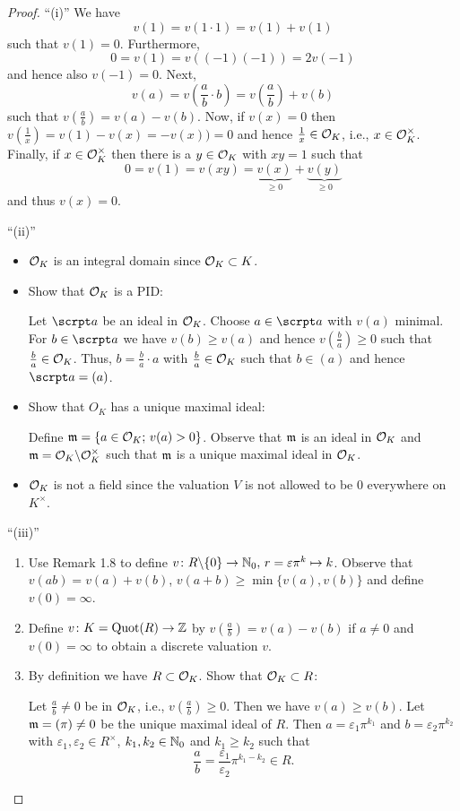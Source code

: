 \begin{proof}
\enquote{(i)}
We have 
\[ v(1) = v(1 \cdot 1) = v(1) + v(1)
\]
such that $v(1) = 0$. Furthermore,
\[ 0 = v(1) = v((-1)(-1)) = 2 v(-1)
\]
and hence also $v(-1)=0$. Next,
\[ v(a) = v\left(\frac{a}{b} \cdot b  \right) = v\left(\frac{a}{b} \right) +v(b)
\]
such that $ v\left(\frac{a}{b} \right) = v(a) -v(b)$.
Now, if $v(x) = 0$ then $v\left(\frac{1}{x} \right) =v(1) -v(x) = -v(x) ) =0$ and hence $\frac{1}{x} \in \mathcal{O}_K$, i.e., $x \in \mathcal{O}_K^\times$.
Finally, if $x \in \mathcal{O}_K^\times$ then there is a $y \in \mathcal{O}_K$ with $xy = 1$ such that
\[ 0 = v(1) = v(xy) = \underbrace{v(x)}_{\geq 0} + \underbrace{v(y)}_{\geq 0}
\]
and thus $v(x) = 0$.

\bigskip \enquote{(ii)} 
\begin{itemize}
\item $\mathcal{O}_K$ is an integral domain since $\mathcal{O}_K\subset K$.

\item Show that $\mathcal{O}_K$ is a PID:

Let $\a$ be an ideal in $\mathcal{O}_K$. Choose $a \in \a$ with $v(a)$ minimal. For $b \in \a$ we have $v(b) \geq v(a)$ and hence $v\left(\frac{b}{a} \right) \geq 0$ such that $\frac{b}{a} \in \mathcal{O}_K$.
Thus, $b = \frac{b}{a} \cdot a$ with $\frac{b}{a} \in \mathcal{O}_K$ such that $b \in (a)$ and hence $\a = (a)$.

\item Show that $O_K$ has a unique maximal ideal:

Define $\mathfrak{m} = \left\{ a \in \mathcal{O}_K; \, v(a) > 0 \right\}$. Observe that $\mathfrak{m}$ is an ideal in $\mathcal{O}_K$ and $\mathfrak{m} = \mathcal{O}_K \backslash \mathcal{O}_K^\times$ such that $\mathfrak{m}$ is a unique maximal ideal in $\mathcal{O}_K$.

\item $\mathcal{O}_K$ is not a field since the valuation $V$ is not allowed to be $0$ everywhere on $K^\times$.
\end{itemize}

\bigskip \enquote{(iii)} 
\begin{enumerate}[(1)]
\item Use Remark 1.8 to define $v \colon R \backslash \{0\} \to \mathbb{N}_0, \,  r = \varepsilon \pi^k \mapsto k$.
Observe that $v(ab) =v(a) + v(b)$, $v(a+b) \geq \min\{ v(a), v(b) \}$ and define $v(0) = \infty$.
\item Define $v \colon K = \operatorname{Quot}(R) \to \mathbb{Z}$ by $v\left(\frac{a}{b} \right) = v(a) -v(b)$ if $a \neq 0$ and $v(0) = \infty$ to obtain a discrete valuation $v$.
\item By definition we have $R\subset \mathcal{O}_K$. Show that $\mathcal{O}_K \subset R$:

Let $\frac{a}{b} \neq 0$ be in $\mathcal{O}_K$, i.e., $v\left(\frac{a}{b} \right) \geq 0$. Then we have $v(a) \geq v(b)$.
Let $\mathfrak{m} = (\pi) \neq 0$ be the unique maximal ideal of $R$. Then
$a = \varepsilon_1 \pi^{k_1}$ and $b = \varepsilon_2 \pi^{k_2}$ with $\varepsilon_1, \varepsilon_2 \in R^\times$, $k_1,k_2 \in \mathbb{N}_0$ and $k_1 \geq k_2$ such that 
\[ \frac{a}{b} = \frac{\varepsilon_1}{\varepsilon_2} \pi^{k_1-k_2} \in R.
\]
\end{enumerate}
\end{proof}

